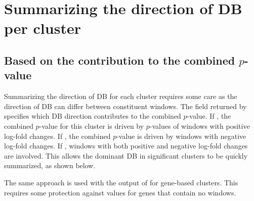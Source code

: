 \documentclass{report}\usepackage[]{graphicx}\usepackage[usenames,dvipsnames]{color}
\newcommand{\hlnum}[1]{\textcolor[rgb]{0.816,0.125,0.439}{#1}}%
\newcommand{\hlopt}[1]{\textcolor[rgb]{0,0,0}{#1}}%
\newcommand{\hlstd}[1]{\textcolor[rgb]{0.251,0.251,0.251}{#1}}%
\newcommand{\hlkwb}[1]{\textcolor[rgb]{0,0,0}{#1}}%
\newcommand{\hlkwd}[1]{\textcolor[rgb]{0.878,0.439,0.125}{#1}}%
\newenvironment{knitrout}{}{} %
\begin{document}
\section{Summarizing the direction of DB per cluster}

\subsection{Based on the contribution to the combined $p$-value}
Summarizing the direction of DB for each cluster requires some care as the direction of DB can differ between constituent windows.
The  field returned by  specifies which DB direction contributes to the combined $p$-value.
If , the combined $p$-value for this cluster is driven by $p$-values of windows with positive log-fold changes.
If , the combined $p$-value is driven by windows with negative log-fold changes.
If , windows with both positive and negative log-fold changes are involved.
This allows the dominant DB in significant clusters to be quickly summarized, as shown below.

\begin{knitrout}
\color{fgcolor}
\end{knitrout}

The same approach is used with the output of  for gene-based clusters.
This requires some protection against  values for genes that contain no windows.

\begin{knitrout}
\color{fgcolor}
\end{knitrout}
\end{document}
